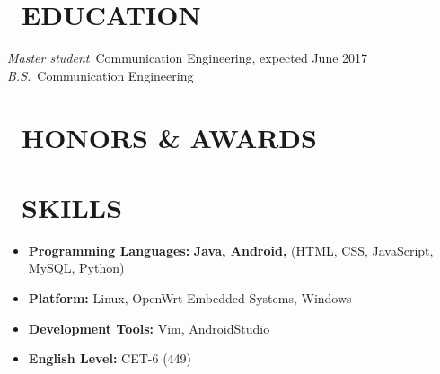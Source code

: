\documentclass{resume}
\begin{document}


 
\section{\faGraduationCap\ EDUCATION}
\textit{Master student}\ Communication Engineering, expected June 2017
\textit{B.S.}\ Communication Engineering

\section{\faTrophy\ HONORS \& AWARDS}
\begin{onehalfspacing}
\end{onehalfspacing}


\section{\faCogs\ SKILLS}
\begin{itemize}[parsep=0.5ex]
  \item \textbf{Programming Languages:} \textbf{Java, Android,} (HTML, CSS, JavaScript, MySQL, Python) 
  \item \textbf{Platform:} Linux, OpenWrt Embedded Systems, Windows
  \item \textbf{Development Tools:} Vim, AndroidStudio
  \item \textbf{English Level:} CET-6 (449)
\end{itemize}
\end{document}
